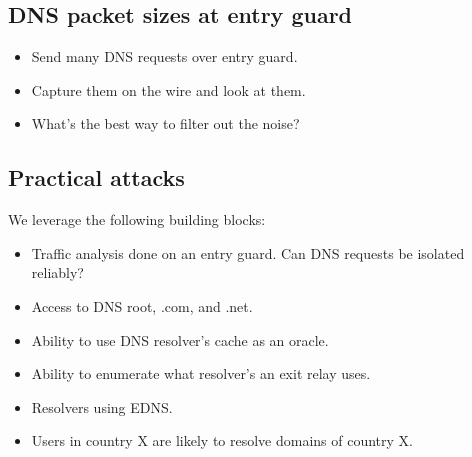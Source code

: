 \subsection{DNS packet sizes at entry guard}
\begin{itemize}
	\item Send many DNS requests over entry guard.
	\item Capture them on the wire and look at them.
	\item What's the best way to filter out the noise?
\end{itemize}

\subsection{Practical attacks}
We leverage the following building blocks:
\begin{itemize}
	\item Traffic analysis done on an entry guard.  Can DNS requests be isolated
		reliably?
	\item Access to DNS root, .com, and .net.
	\item Ability to use DNS resolver's cache as an oracle.
	\item Ability to enumerate what resolver's an exit relay uses.
	\item Resolvers using EDNS.
	\item Users in country X are likely to resolve domains of country X.
\end{itemize}
